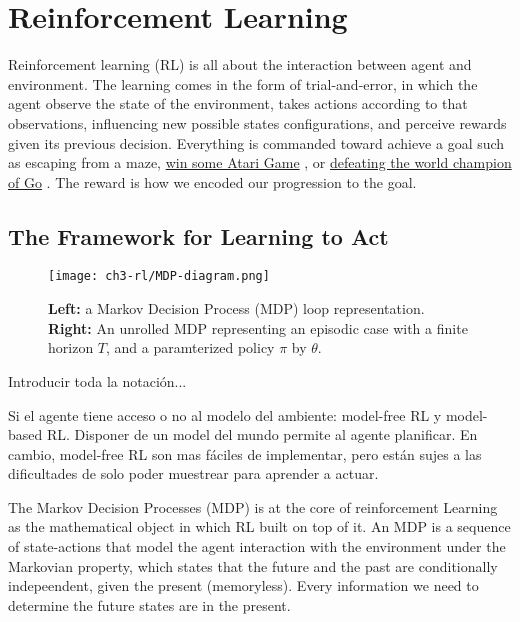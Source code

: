 \chapter{Reinforcement Learning}

Reinforcement learning (RL) is all about the interaction between agent and environment. The learning comes in the form of trial-and-error, in which the agent observe the state of the environment, takes actions according to that observations, influencing new possible states configurations, and perceive rewards given its previous decision. Everything is commanded toward achieve a goal such as escaping from a maze, \href{https://arxiv.org/abs/1312.5602}{win some Atari Game} \citep{mnih2013playing}, or \href{https://deepmind.google/technologies/alphago/}{defeating the world champion of Go} \citep{silver2016mastering}. The reward is how we encoded our progression to the goal.

\section{The Framework for Learning to Act}

\begin{figure}[ht]
    \centering
    \texttt{[image: ch3-rl/MDP-diagram.png]}
    \captionsetup{width=\textwidth} %
    \caption{\textbf{Left:} a Markov Decision Process (MDP) loop representation. \textbf{Right:} An unrolled MDP representing an episodic case with a finite horizon $T$, and a paramterized policy $\pi$ by $\theta$.}
    \label{fig:mdp-diagram}
  \end{figure}

Introducir toda la notación...

Si el agente tiene acceso o no al modelo del ambiente: model-free RL y model-based RL. Disponer de un model del mundo permite al agente planificar. 
En cambio, model-free RL son mas fáciles de implementar, pero están
sujes a las dificultades de solo poder muestrear para aprender a 
actuar.

The Markov Decision Processes (MDP) is at the core of reinforcement Learning as the mathematical object in which RL built on top of it. An MDP is a sequence of state-actions that model the agent interaction with the environment under the Markovian property, which states that the future and the past are
conditionally indepeendent, given the present (memoryless). Every information we
need to determine the future states are in the present.

